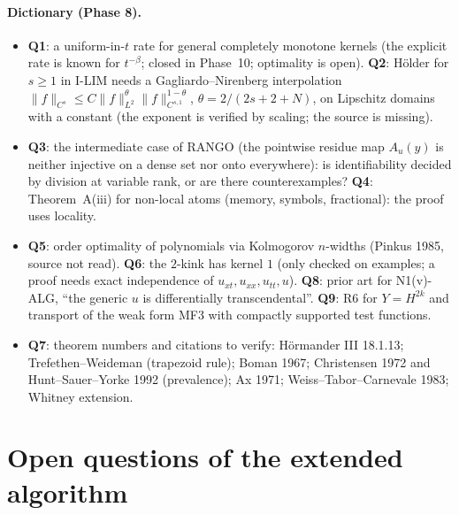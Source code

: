 \paragraph{Dictionary (Phase 8).}
\begin{itemize}
\item \textbf{Q1}: a uniform-in-$t$ rate for general completely monotone kernels (the explicit rate is known for $t^{-\beta}$; closed in Phase~10; optimality is open). \textbf{Q2}: H\"older for $s\ge1$ in I-LIM needs a Gagliardo--Nirenberg interpolation $\|f\|_{C^s}\le C\|f\|_{L^2}^\theta\|f\|_{C^{s,1}}^{1-\theta}$, $\theta=2/(2s+2+N)$, on Lipschitz domains with a constant (the exponent is verified by scaling; the source is missing).
\item \textbf{Q3}: the intermediate case of RANGO (the pointwise residue map $A_u(y)$ is neither injective on a dense set nor onto everywhere): is identifiability decided by division at variable rank, or are there counterexamples? \textbf{Q4}: Theorem~A(iii) for non-local atoms (memory, symbols, fractional): the proof uses locality.
\item \textbf{Q5}: order optimality of polynomials via Kolmogorov $n$-widths (Pinkus 1985, source not read). \textbf{Q6}: the $2$-kink has kernel $1$ (only checked on examples; a proof needs exact independence of $u_{xt},u_{xx},u_{tt},u$). \textbf{Q8}: prior art for N1(v)-ALG, ``the generic $u$ is differentially transcendental''. \textbf{Q9}: R6 for $Y=H^{2k}$ and transport of the weak form MF3 with compactly supported test functions.
\item \textbf{Q7}: theorem numbers and citations to verify: H\"ormander III 18.1.13; Trefethen--Weideman (trapezoid rule); Boman 1967; Christensen 1972 and Hunt--Sauer--Yorke 1992 (prevalence); Ax 1971; Weiss--Tabor--Carnevale 1983; Whitney extension.
\end{itemize}

\section{Open questions of the extended algorithm}

